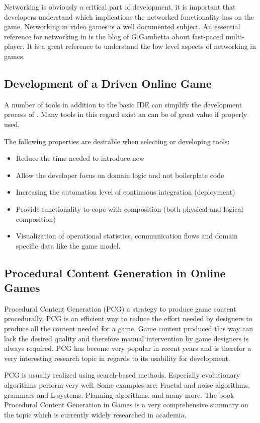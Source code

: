 Networking is obviously a critical part of \og{} development. it is important
that developers understand which implications the networked functionality has on
the game. Networking in video games is a well documented subject. An essential
reference for networking in \ogs{} is the blog of
G.Gambetta\cite{gambetta_fast_paced} about fast-paced multi-player. It is a
great reference to understand the low level aspects of networking in games.


\subsection{Development of a \ms{} Driven Online Game}

A number of tools in addition to the basic IDE can simplify the development
process of \ms{}. Many tools in this regard exist an can be of great value if
properly used. 

The following properties are desirable when selecting or developing tools:

\begin{itemize}
  \item Reduce the time needed to introduce new \mss{}
  \item Allow the developer focus on domain logic and not boilerplate code
  \item Increasing the automation level of continuous integration (deployment)
  \item Provide functionality to cope with \mss{} composition (both physical
  and logical composition)
  \item Visualization of operational statistics, communication flows and domain
  specific data like the game model.
\end{itemize}

\subsection{Procedural Content Generation in Online Games}

Procedural Content Generation (PCG) a strategy to produce game content
procedurally. PCG is an efficient way to reduce the effort needed by designers
to produce all the content needed for a game. Game content produced this way can
lack the desired quality and therefore manual intervention by game designers is
always required. PCG has become very popular in recent years
\cite{lee2014procedural} and is therefor a very interesting research topic in
regards to its usability for \og{} development.

PCG is usually realized using search-based methods. Especially evolutionary
algorithms perform very well. Some examples are: Fractal and noise algorithms,
grammars and L-systems, Planning algorithms, and many more. The book Procedural
Content Generation in Games \cite{shaker2014procedural} is a very comprehensive
summary on the topic which is currently widely researched in academia.
